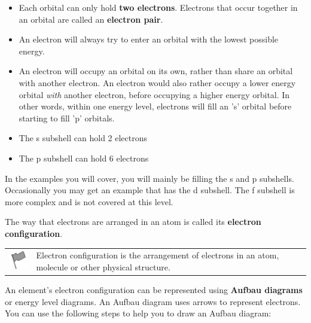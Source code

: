 \par \label{m38741*id259303}\begin{itemize}[noitemsep]
            \label{m38741*uid93}\item Each orbital can only hold \textbf{two electrons}. Electrons that occur together in an orbital are called an \textbf{electron pair}.
\label{m38741*uid94}\item An electron will always try to enter an orbital with the lowest possible energy.
\label{m38741*uid95}\item An electron will occupy an orbital on its own, rather than share an orbital with another electron. An electron would also rather occupy a lower energy orbital \textsl{with} another electron, before occupying a higher energy orbital. In other words, within one energy level, electrons will fill an 's' orbital before starting to fill 'p' orbitals.
\label{m38741*uid83}\item The s subshell can hold 2 electrons
\label{m38741*uid84}\item The p subshell can hold 6 electrons
\end{itemize}
        \label{m38741*eip-15}In the examples you will cover, you will mainly be filling the s and p subshells. Occasionally you may get an example that has the d subshell. The f subshell is more complex and is not covered at this level.
\par 
        \label{m38741*id259599}The way that electrons are arranged in an atom is called its \textbf{electron configuration}.\par 
\label{m38741*fhsst!!!underscore!!!id709}\begin{definition}
	  \begin{tabular*}{15 cm}{m{15 mm}m{}}
	\hspace*{-50pt}  \includegraphics[width=0.5in]{col11305.imgs/psflag2.png}   & \Definition{   \label{id2420737}\textbf{ Electron configuration }} { \label{m38741*meaningfhsst!!!underscore!!!id709}
        \label{m38741*id259615}Electron configuration is the arrangement of electrons in an atom, molecule or other physical structure. \par 
         } 
      \end{tabular*}
      \end{definition}
        \label{m38741*id259628}An element's electron configuration can be represented using \textbf{Aufbau diagrams} or energy level diagrams. An Aufbau diagram uses arrows to represent electrons. You can use the following steps to help you to draw an Aufbau diagram:\par 
